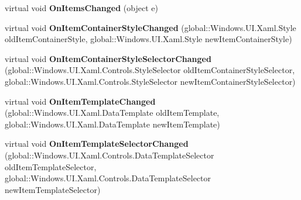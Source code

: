 \begin{DoxyCompactItemize}
\item 
\mbox{\label{class_windows_1_1_u_i_1_1_xaml_1_1_controls_1_1_items_control_af4965a6cf05198973920cd4d95c82dbc}} 
virtual void {\bfseries On\+Items\+Changed} (object e)
\item 
\mbox{\label{class_windows_1_1_u_i_1_1_xaml_1_1_controls_1_1_items_control_a6621d703e5349274aade1e24d36daf58}} 
virtual void {\bfseries On\+Item\+Container\+Style\+Changed} (global\+::\+Windows.\+U\+I.\+Xaml.\+Style old\+Item\+Container\+Style, global\+::\+Windows.\+U\+I.\+Xaml.\+Style new\+Item\+Container\+Style)
\item 
\mbox{\label{class_windows_1_1_u_i_1_1_xaml_1_1_controls_1_1_items_control_ad8e007d53e0d23a9f7110575da6f5432}} 
virtual void {\bfseries On\+Item\+Container\+Style\+Selector\+Changed} (global\+::\+Windows.\+U\+I.\+Xaml.\+Controls.\+Style\+Selector old\+Item\+Container\+Style\+Selector, global\+::\+Windows.\+U\+I.\+Xaml.\+Controls.\+Style\+Selector new\+Item\+Container\+Style\+Selector)
\item 
\mbox{\label{class_windows_1_1_u_i_1_1_xaml_1_1_controls_1_1_items_control_af029f0f8a1bb58b753a65311caf08358}} 
virtual void {\bfseries On\+Item\+Template\+Changed} (global\+::\+Windows.\+U\+I.\+Xaml.\+Data\+Template old\+Item\+Template, global\+::\+Windows.\+U\+I.\+Xaml.\+Data\+Template new\+Item\+Template)
\item 
\mbox{\label{class_windows_1_1_u_i_1_1_xaml_1_1_controls_1_1_items_control_af6a143834a45fdc2422edde6c8dbe3dd}} 
virtual void {\bfseries On\+Item\+Template\+Selector\+Changed} (global\+::\+Windows.\+U\+I.\+Xaml.\+Controls.\+Data\+Template\+Selector old\+Item\+Template\+Selector, global\+::\+Windows.\+U\+I.\+Xaml.\+Controls.\+Data\+Template\+Selector new\+Item\+Template\+Selector)
\item 
\mbox{\label{class_windows_1_1_u_i_1_1_xaml_1_1_controls_1_1_items_control_adea6b7c5dc22e6a94522e632340290be}} 

\end{DoxyCompactItemize}
